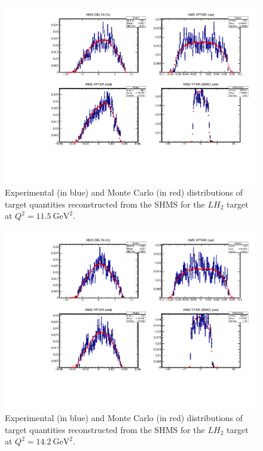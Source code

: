\begin{figure}[!h]
    \centering
    \includegraphics[page=2,width=1.0\textwidth]{pass5_report/Report_h115.pdf}
    \caption{
            Experimental (in blue) and Monte Carlo (in red) distributions of
            target quantities reconstructed from the SHMS for
            the $LH_2$ target at $Q^2=\SI{11.5}{\giga\electronvolt\squared}$.
            }
    \label{fig:Report_h115.pdf}
\end{figure}


\begin{figure}[!h]
    \centering
    \includegraphics[page=2,width=1.0\textwidth]{pass5_report/Report_h143.pdf}
    \caption{
            Experimental (in blue) and Monte Carlo (in red) distributions of
            target quantities reconstructed from the SHMS for
            the $LH_2$ target at $Q^2=\SI{14.2}{\giga\electronvolt\squared}$.
            }
    \label{fig:Report_h143.pdf}
\end{figure}


